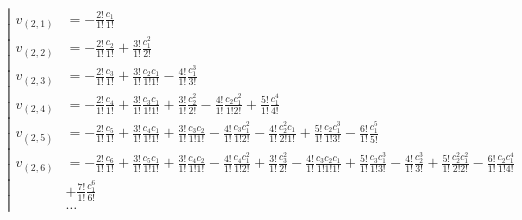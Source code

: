 \begin{equation*}
\left|
\begin{aligned}
v_{(2,1)} 
&=
- \frac{2!}{1!} \frac{c_1}{1!} \\ 
v_{(2,2)} 
&= 
- \frac{2!}{1!} \frac{c_2}{1!} 
+ \frac{3!}{1!} \frac{c_1^2}{2!} \\
v_{(2,3)} 
&= 
- \frac{2!}{1!} \frac{c_3}{1!} 
+ \frac{3!}{1!} \frac{c_2 c_1}{1!1!} 
- \frac{4!}{1!} \frac{c_1^3}{3!} \\
v_{(2,4)}
&= 
- \frac{2!}{1!} \frac{c_4}{1!} 
+ \frac{3!}{1!} \frac{c_3 c_1}{1!1!} 
+ \frac{3!}{1!} \frac{c_2^2}{2!}
- \frac{4!}{1!} \frac{c_2 c_1^2}{1!2!}
+ \frac{5!}{1!} \frac{c_1^4}{4!} \\
v_{(2,5)}
&= 
- \frac{2!}{1!} \frac{c_5}{1!} 
+ \frac{3!}{1!} \frac{c_4 c_1}{1!1!} 
+ \frac{3!}{1!} \frac{c_3 c_2}{1!1!}
- \frac{4!}{1!} \frac{c_3 c_1^2}{1!2!}
- \frac{4!}{1!} \frac{c_2^2 c_1}{2!1!}
+ \frac{5!}{1!} \frac{c_2 c_1^3}{1!3!}
- \frac{6!}{1!} \frac{c_1^5}{5!} \\
v_{(2,6)}
&
= 
- \frac{2!}{1!} \frac{c_6}{1!} 
+ \frac{3!}{1!} \frac{c_5 c_1}{1!1!} 
+ \frac{3!}{1!} \frac{c_4 c_2}{1!1!}
- \frac{4!}{1!} \frac{c_4 c_1^2}{1!2!}
+ \frac{3!}{1!} \frac{c_3^2}{2!}
- \frac{4!}{1!} \frac{c_3 c_2 c_1}{1!1!1!}
+ \frac{5!}{1!} \frac{c_3 c_1^3}{1!3!}
- \frac{4!}{1!} \frac{c_2^3}{3!}
+ \frac{5!}{1!} \frac{c_2^2 c_1^2}{2!2!}
- \frac{6!}{1!} \frac{c_2 c_1^4}{1!4!} \\
&
+ \frac{7!}{1!} \frac{c_1^6}{6!} \\
&\dots
\end{aligned}
\right.
\end{equation*}


